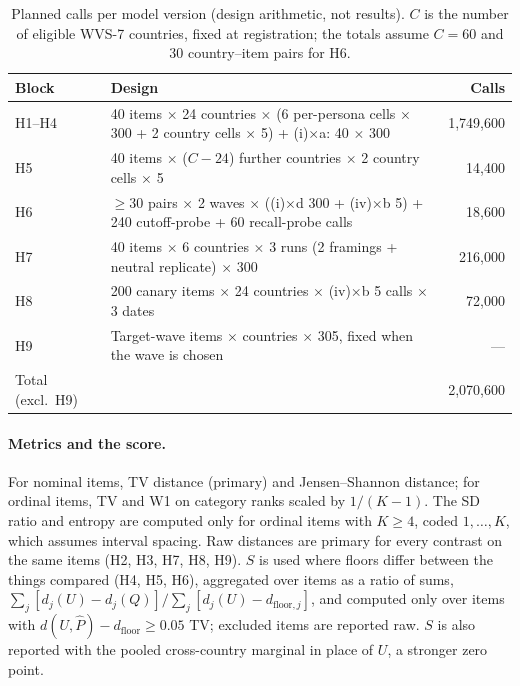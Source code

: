 \documentclass[11pt]{article}
\begin{document}
\begin{table}[!htbp]
\centering
\scriptsize
\caption{Planned calls per model version (design arithmetic, not results). $C$ is the number of eligible WVS-7 countries, fixed at registration; the totals assume $C = 60$ and 30 country--item pairs for H6.}
\label{tab:budget}
\begin{tabular}{@{}L{2.4cm}L{6.6cm}r@{}}
\toprule
Block & Design & Calls \\
\midrule
H1--H4 & 40 items $\times$ 24 countries $\times$ (6 per-persona cells $\times$ 300 + 2 country cells $\times$ 5) + (i)$\times$a: 40 $\times$ 300 & 1,749,600 \\
H5 & 40 items $\times$ ($C - 24$) further countries $\times$ 2 country cells $\times$ 5 & 14,400 \\
H6 & $\geq$30 pairs $\times$ 2 waves $\times$ ((i)$\times$d 300 + (iv)$\times$b 5) + 240 cutoff-probe + 60 recall-probe calls & 18,600 \\
H7 & 40 items $\times$ 6 countries $\times$ 3 runs (2 framings + neutral replicate) $\times$ 300 & 216,000 \\
H8 & 200 canary items $\times$ 24 countries $\times$ (iv)$\times$b 5 calls $\times$ 3 dates & 72,000 \\
H9 & Target-wave items $\times$ countries $\times$ 305, fixed when the wave is chosen & --- \\
\midrule
Total (excl.\ H9) & & 2,070,600 \\
\bottomrule
\end{tabular}
\end{table}

\paragraph{Metrics and the score.} For nominal items, TV distance (primary) and Jensen--Shannon distance; for ordinal items, TV and W1 on category ranks scaled by $1/(K-1)$. The SD ratio and entropy are computed only for ordinal items with $K \geq 4$, coded $1,\dots,K$, which assumes interval spacing. Raw distances are primary for every contrast on the same items (H2, H3, H7, H8, H9). $S$ is used where floors differ between the things compared (H4, H5, H6), aggregated over items as a ratio of sums, $\sum_j [d_j(U) - d_j(Q)] / \sum_j [d_j(U) - d_{\text{floor},j}]$, and computed only over items with $d(U, \hat P) - d_{\text{floor}} \geq 0.05$ TV; excluded items are reported raw. $S$ is also reported with the pooled cross-country marginal in place of $U$, a stronger zero point.
\end{document}
